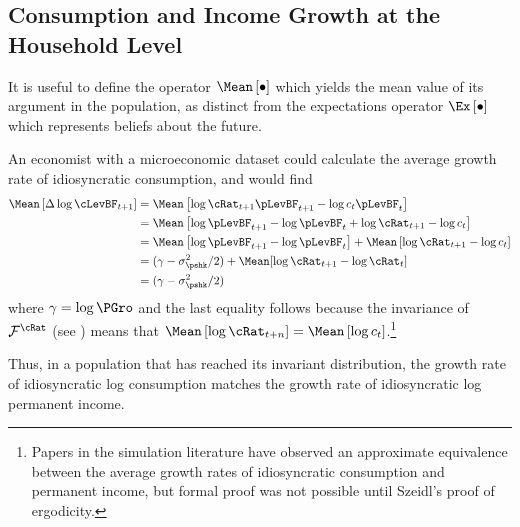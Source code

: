 \documentclass[BufferStockTheory]{subfiles}
\begin{document}
\hypertarget{Consumption-and-Income-Growth-at-the-Household-Level}{}
\subsection{Consumption and Income Growth at the Household Level}

It is useful to define the operator $\Mean\left[\bullet\right]$
which yields the mean value of its argument in the population, as
distinct from the expectations operator $\Ex\left[\bullet\right]$ which represents beliefs about the
future.

An economist with a microeconomic dataset could calculate the average
growth rate of idiosyncratic consumption, and would find
\begin{align*}
  \Mean\left[\Delta \log \cLevBF_{t+1}\right]  & = \Mean\left[ \log {\cRat}_{t+1}\pLevBF_{t+1} - \log c_{t}\pLevBF_{t}\right]  \notag \\
                                               & = \Mean\left[ \log \pLevBF_{t+1}- \log \pLevBF_{t} + \log {\cRat}_{t+1} - \log c_{t}\right]  \notag \\
                                               & = \Mean\left[ \log \pLevBF_{t+1}- \log \pLevBF_{t}\right] + \Mean\left[ \log {\cRat}_{t+1} - \log c_{t}\right]  \notag \\
                                               & = (\gamma - \sigma^{2}_{\pshk}/2) + \Mean[\log \cRat_{t+1} - \log \cRat_{t}] \\
                                               & = (\gamma - \sigma^{2}_{\pshk}/2)
\end{align*}
where $\gamma=\log \PGro$ and the last equality follows because the invariance of
$\mathcal{F}^{\cRat}$ (see \cite{szeidlInvariant}) means that $\Mean\left[ \log
  {\cRat}_{t+n}\right] = \Mean\left[ \log
  c_{t}\right]$.\footnote{Papers in the simulation literature have
  observed an approximate equivalence between the average growth rates
  of idiosyncratic consumption and permanent income, but formal proof
  was not possible until Szeidl's proof of ergodicity.}

Thus, in a population that has reached its invariant distribution, the growth
rate of idiosyncratic log consumption matches the growth rate of idiosyncratic log permanent income.
\end{document}
